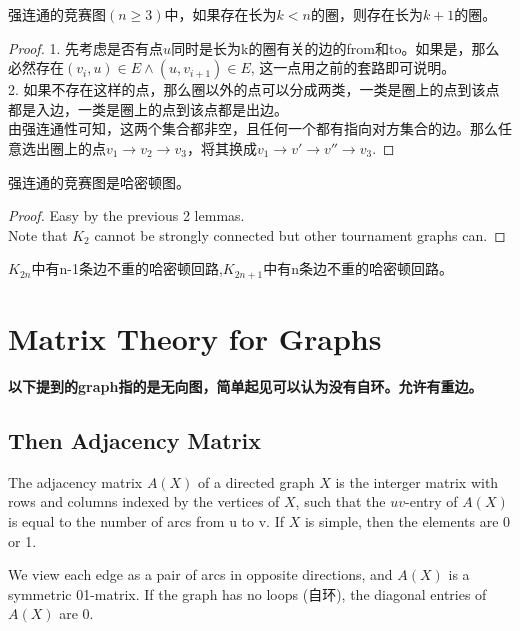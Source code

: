 \documentclass[11pt,fleqn]{book} %
\begin{document}
\begin{CJK}{UTF8}{gkai}
\begin{lemma}
    强连通的竞赛图$(n\geq 3)$中，如果存在长为$k < n$的圈，则存在长为$k+1$的圈。
\end{lemma}
\begin{proof}
    1. 先考虑是否有点$u$同时是长为k的圈有关的边的from和to。如果是，那么必然存在$(v_i,u) \in E \wedge (u, v_{i+1}) \in E$, 这一点用之前的套路即可说明。\\
    2. 如果不存在这样的点，那么圈以外的点可以分成两类，一类是圈上的点到该点都是入边，一类是圈上的点到该点都是出边。\\
    由强连通性可知，这两个集合都非空，且任何一个都有指向对方集合的边。那么任意选出圈上的点$v_1 \to v_2\to v_3$，将其换成$v_1 \to v' \to v'' \to v_3$.
\end{proof}

\begin{theorem}
    强连通的竞赛图是哈密顿图。
\end{theorem}
\begin{proof}
    Easy by the previous 2 lemmas. \\
    Note that $K_2$ cannot be strongly connected but other tournament graphs can.
\end{proof}

\begin{theorem}
    $K_{2n}$中有n-1条边不重的哈密顿回路,$K_{2n+1}$中有n条边不重的哈密顿回路。
\end{theorem}

\chapter{Matrix Theory for Graphs}
\textbf{以下提到的graph指的是无向图，简单起见可以认为没有自环。允许有重边。}
\section{Then Adjacency Matrix}
\begin{definition}
     The adjacency matrix $A(X)$ of a directed graph $X$ is the interger matrix with rows and columns indexed by the vertices of $X$, such that the $uv$-entry of $A(X)$
    is equal to the number of arcs from u to v. If $X$ is simple, then the elements are 0 or 1.
\end{definition}

\begin{definition}
     We view each edge as a pair of arcs in opposite directions, and $A(X)$ is a symmetric 01-matrix. If the graph has no loops (自环), the diagonal entries of $A(X)$ are 0.
\end{definition}


\end{CJK}
\end{document}
